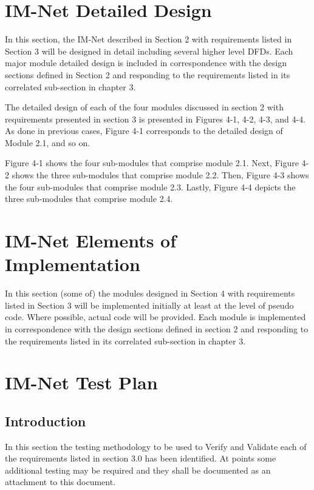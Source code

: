 \documentclass[letterpaper]{article}
\begin{document}
\section{IM-Net Detailed Design}

In this section, the IM-Net described in Section 2 with requirements listed in Section 3 will be designed in detail including several higher level DFDs. Each major module detailed design is included in correspondence with the design sections defined in Section 2 and responding to the requirements listed in its correlated sub-section in chapter 3.

The detailed design of each of the four modules discussed in section 2 with requirements presented in section 3 is presented in Figures 4-1, 4-2, 4-3, and 4-4. As done in previous cases, Figure 4-1 corresponds to the detailed design of Module 2.1, and so on.

Figure 4-1 shows the four sub-modules that comprise module 2.1. Next, Figure 4-2 shows the three sub-modules that comprise module 2.2. Then, Figure 4-3 shows the four sub-modules that comprise module 2.3. Lastly, Figure 4-4 depicts the three sub-modules that comprise module 2.4.

\eject 

 
\section{IM-Net Elements of Implementation}

In this section (some of) the modules designed in Section 4 with requirements listed in Section 3 will be implemented initially at least at the level of pseudo code. Where possible, actual code will be provided. Each module is implemented in correspondence with the design sections defined in section 2 and responding to the requirements listed in its correlated sub-section in chapter 3.

\eject 

\section{IM-Net Test Plan}

\subsection{Introduction}

In this section the testing methodology to be used to Verify and Validate each of the requirements listed in section 3.0 has been identified. At points some additional testing may be required and they shall be documented as an attachment to this document. 
\end{document}
